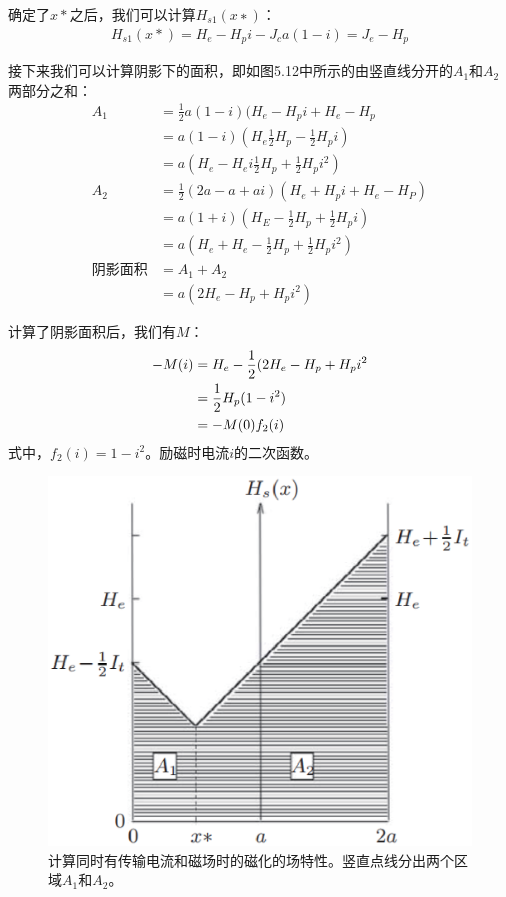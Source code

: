 确定了$x*$之后，我们可以计算$H_{s1}(x∗)$：
\begin{align*}%
H_{s1}(x*)=H_{e}-H_{p}i-J_{c}a(1-i)=J_{e}-H_{p}
\end{align*}

接下来我们可以计算阴影下的面积，即如图5.12中所示的由竖直线分开的$A_1$和$A_2$两部分之和：
\begin{align*}%
A_{1}&=\frac{1}{2}a(1-i)(H_{e}-H_{p}i+H_{e}-H_{p}\\
&=a(1-i)(H_{e}\frac{1}{2}H_{p}-\frac{1}{2}H_{p}i)\\
&=a(H_{e}-H_{e}i\frac{1}{2}H_{p}+\frac{1}{2}H_{p}i^{2})\\
A_{2}&=\frac{1}{2}(2a-a+ai)(H_{e}+H_{p}i+H_{e}-H_{P})\\
&=a(1+i)(H_E-\frac{1}{2}H_{p}+\frac{1}{2}H_{p}i)\\
&=a(H_{e}+H_{e}-\frac{1}{2}H_{p}+\frac{1}{2}H_{p}i^{2})\\
\mbox{阴影面积}&=A_{1}+A_{2}\\
&=a(2H_{e}-H_{p}+H_{p}i^{2})
\end{align*}

计算了阴影面积后，我们有$M$：
\begin{subequations}
	\begin{align}
-M(i)&=H_{e}-\frac{1}{2}(2H_{e}-H_{p}+H_{p}i^{2}\\\notag
&=\frac{1}{2}H_{p}(1-i^{2})\\
&=-M(0)f_{2}(i)
	\end{align}
\end{subequations}
式中，$f_2(i) = 1 − i^2$。励磁时电流$i$的二次函数。

\begin{figure}[htbp]
	\centering
	\includegraphics[scale=0.5]{chpt5/figs/fig5.12.eps}
	\caption{计算同时有传输电流和磁场时的磁化的场特性。竖直点线分出两个区域$A_1$和$A_2$。}
\end{figure}


